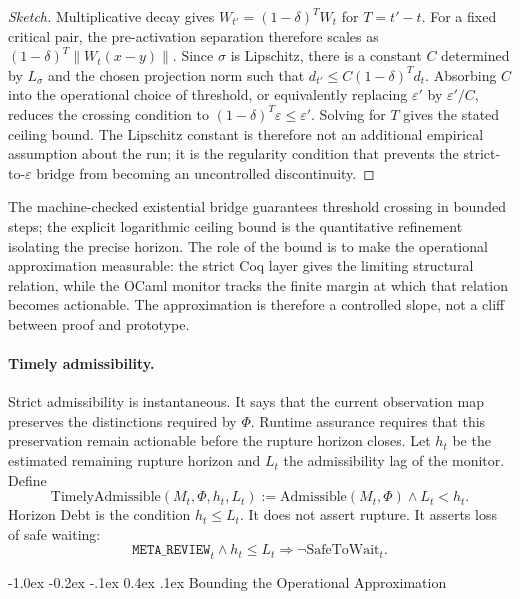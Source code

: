 \documentclass{llncs}
\makeatletter
\renewcommand\subsection{\@startsection{subsection}{2}{\z@}%
  {-1.0ex \@plus -0.2ex \@minus -.1ex}%
  {0.4ex \@plus .1ex}%
  {\normalfont\normalsize\bfseries}}
\makeatother
\begin{document}
\begin{proof}[Sketch]
Multiplicative decay gives $W_{t'}=(1-\delta)^T W_t$ for $T=t'-t$.
For a fixed critical pair, the pre-activation separation therefore scales
as $(1-\delta)^T\|W_t(x-y)\|$. Since $\sigma$ is Lipschitz, there is a
constant $C$ determined by $L_\sigma$ and the chosen projection norm such
that $d_{t'}\leq C(1-\delta)^T d_t$. Absorbing $C$ into the operational
choice of threshold, or equivalently replacing $\varepsilon'$ by
$\varepsilon'/C$, reduces the crossing condition to
$(1-\delta)^T\varepsilon\leq\varepsilon'$. Solving for $T$ gives the
stated ceiling bound. The Lipschitz constant is therefore not an
additional empirical assumption about the run; it is the regularity
condition that prevents the strict-to-$\varepsilon$ bridge from becoming
an uncontrolled discontinuity.
\end{proof}

The machine-checked existential bridge guarantees threshold crossing in
bounded steps; the explicit logarithmic ceiling bound is the quantitative
refinement isolating the precise horizon. The role of the bound is to
make the operational approximation measurable: the strict Coq layer gives
the limiting structural relation, while the OCaml monitor tracks the
finite margin at which that relation becomes actionable. The approximation
is therefore a controlled slope, not a cliff between proof and prototype.

\paragraph{Timely admissibility.}
Strict admissibility is instantaneous. It says that the current observation map preserves the distinctions required by \(\Phi\). Runtime assurance requires that this preservation remain actionable before the rupture horizon closes. Let \(h_t\) be the estimated remaining rupture horizon and \(L_t\) the admissibility lag of the monitor. Define
\[
\mathrm{TimelyAdmissible}(M_t,\Phi,h_t,L_t)
:=
\mathrm{Admissible}(M_t,\Phi)\wedge L_t<h_t.
\]
Horizon Debt is the condition \(h_t\leq L_t\). It does not assert rupture. It asserts loss of safe waiting:
\[
\mathtt{META\_REVIEW}_t \wedge h_t\leq L_t
\Rightarrow \neg \mathrm{SafeToWait}_t .
\]

\subsection{Bounding the Operational Approximation}
\label{sec:opbound-empirical}
\end{document}
